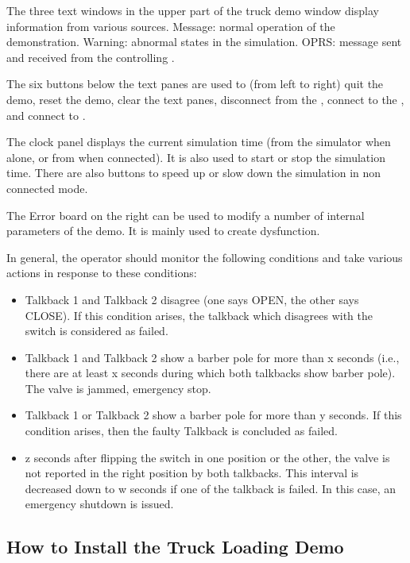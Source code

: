 The three text windows in the upper part of the truck demo window display
information from various sources. Message: normal operation of the
demonstration. Warning: abnormal states in the simulation. OPRS: message sent
and received from the controlling \CPK{}.

The six buttons below the text panes are used to (from left to right) quit the
demo, reset the demo, clear the text panes, disconnect from the \CPK{}, connect
to the \MPA{}, and connect to \CPK{}.

The clock panel displays the current simulation time (from the simulator when
alone, or from \CPK{} when connected). It is also used to start or stop the
simulation time. There are also buttons to speed up or slow down the simulation
in non connected mode.

The Error board on the right can be used to modify a number of internal
parameters of the demo. It is mainly used to create dysfunction.

In general, the operator should monitor the following conditions and take
various actions in response to these conditions:

\begin{itemize}

\item Talkback 1 and Talkback 2 disagree (one says OPEN, the other says
CLOSE). If this condition arises, the talkback which disagrees with the switch
is considered as failed.

\item Talkback 1 and Talkback 2 show a barber pole for more than x seconds
(i.e., there are at least x seconds during which both talkbacks show
barber pole). The valve is jammed, emergency stop.

\item Talkback 1 or Talkback 2 show a barber pole for more than y seconds.
If this condition arises, then the faulty Talkback is concluded as failed.

\item z seconds after flipping the switch in one position or the other,
the valve is not reported in the right position by both talkbacks. This
interval is decreased down to w seconds if one of the talkback is failed. In
this case, an emergency shutdown is issued.

\end{itemize}

\subsection{How to Install the Truck Loading Demo}


